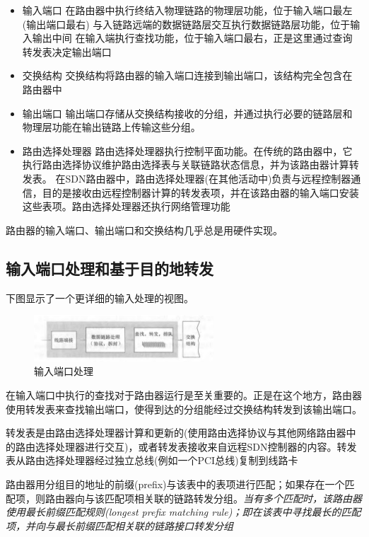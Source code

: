 \begin{itemize}
    \item 输入端口
    \subitem 在路由器中执行终结入物理链路的物理层功能，位于输入端口最左(输出端口最右)
    \subitem 与入链路远端的数据链路层交互执行数据链路层功能，位于输入输出中间
    \subitem 在输入端执行查找功能，位于输入端口最右，正是这里通过查询转发表决定输出端口
    \item 交换结构 
    \subitem 交换结构将路由器的输入端口连接到输出端口，该结构完全包含在路由器中
    \item 输出端口
    \subitem 输出端口存储从交换结构接收的分组，并通过执行必要的链路层和物理层功能在输出链路上传输这些分组。
    \item 路由选择处理器
    \subitem 路由选择处理器执行控制平面功能。在传统的路由器中，它执行路由选择协议维护路由选择表与关联链路状态信息，并为该路由器计算转发表。
    \subitem 在SDN路由器中，路由选择处理器(在其他活动中)负责与远程控制器通信，目的是接收由远程控制器计算的转发表项，并在该路由器的输入端口安装这些表项。路由选择处理器还执行网络管理功能
\end{itemize}

    路由器的输入端口、输出端口和交换结构几乎总是用硬件实现。

\subsection{输入端口处理和基于目的地转发}

    下图显示了一个更详细的输入处理的视图。

\begin{figure}[!htbp]
    \centering
    \includegraphics[width=0.6\textwidth]{image/chapter04/输入端口处理.png}
    \caption{输入端口处理}
\end{figure}

    在输入端口中执行的查找对于路由器运行是至关重要的。正是在这个地方，路由器使用转发表来查找输出端口，使得到达的分组能经过交换结构转发到该输出端口。

    转发表是由路由选择处理器计算和更新的(使用路由选择协议与其他网络路由器中的路由选择处理器进行交互)，或者转发表接收来自远程SDN控制器的内容。转发表从路由选择处理器经过独立总线(例如一个PCI总线)复制到线路卡

    路由器用分组目的地址的前缀(prefix)与该表中的表项进行匹配；如果存在一个匹配项，则路由器向与该匹配项相关联的链路转发分组。\emph{当有多个匹配时，该路由器使用最长前缀匹配规则(longest prefix matching rule)；即在该表中寻找最长的匹配项，并向与最长前缀匹配相关联的链路接口转发分组}

